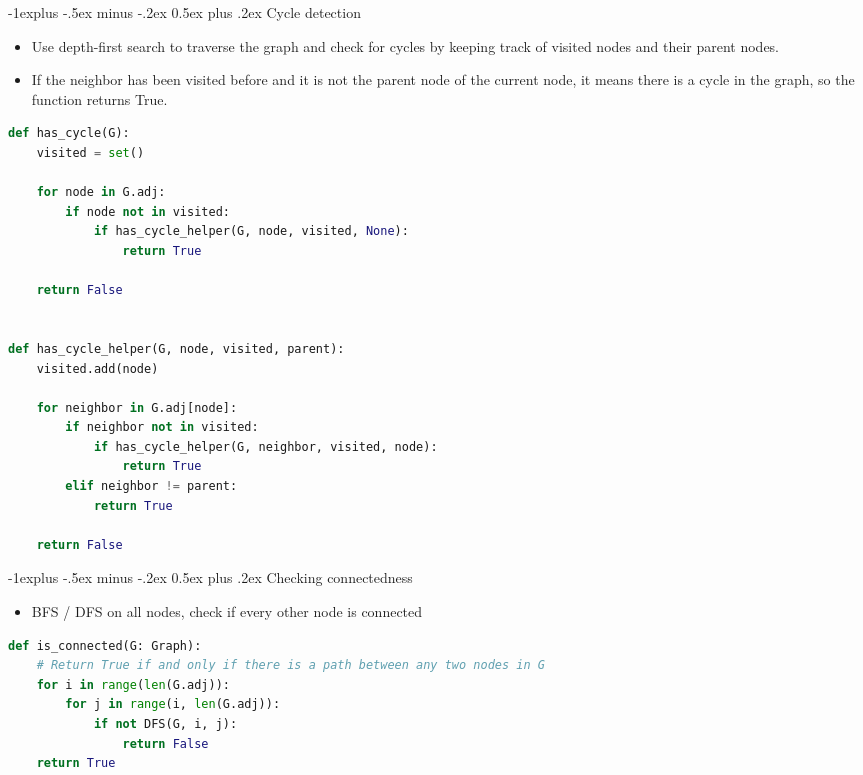 \documentclass[letterpaper, 8pt]{extarticle}
\makeatletter
\renewcommand{\subsection}{\@startsection{subsection}{2}{0mm}%
                                {-1explus -.5ex minus -.2ex}%
                                {0.5ex plus .2ex}%
                                {\normalfont\small\bfseries}}
\makeatother
\begin{document}
\begin{multicols*}{5}
\subsection{Cycle detection}
\begin{itemize}
    \item Use depth-first search to traverse the graph and check for cycles by keeping track of visited nodes and their parent nodes.
    \item If the neighbor has been visited before and it is not the parent node of the current node, it means there is a cycle in the graph, so the function returns True.
\end{itemize}
\begin{lstlisting}[language=Python, breaklines=true, postbreak=\mbox{\textcolor{red}{$\hookrightarrow$}\space}]
def has_cycle(G):
    visited = set()

    for node in G.adj:
        if node not in visited:
            if has_cycle_helper(G, node, visited, None):
                return True

    return False


def has_cycle_helper(G, node, visited, parent):
    visited.add(node)

    for neighbor in G.adj[node]:
        if neighbor not in visited:
            if has_cycle_helper(G, neighbor, visited, node):
                return True
        elif neighbor != parent:
            return True

    return False
\end{lstlisting}

\subsection{Checking connectedness}
\begin{itemize}
    \item BFS / DFS on all nodes, check if every other node is connected
\end{itemize}
\begin{lstlisting}[language=Python]
def is_connected(G: Graph):
    # Return True if and only if there is a path between any two nodes in G
    for i in range(len(G.adj)):
        for j in range(i, len(G.adj)):
            if not DFS(G, i, j):
                return False
    return True
\end{lstlisting}


\end{multicols*}
\end{document}
